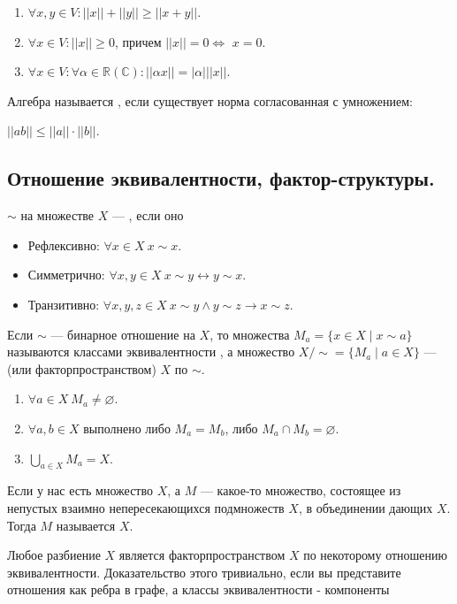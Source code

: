 \begin{enumerate}
    \item $\forall x, y \in V : ||x|| + ||y||\geq ||x+y||$.
    \item $\forall x \in V : ||x||\geq 0$, причем $||x||=0 \Leftrightarrow$ $x = 0$.
    \item $\forall x \in V : \forall \alpha \in \mathbb{R}(\mathbb{C}) : ||\alpha x|| = |\alpha|||x||$.
\end{enumerate}

Алгебра называется , если существует норма согласованная с умножением:

$||ab||\leq ||a|| \cdot ||b||$.

\subsection{Отношение эквивалентности, фактор-структуры.}



 $\sim$ на множестве $X$ --- , если оно
\begin{itemize}
    \item Рефлексивно: $\forall x\in X~x\sim x$.
    \item Симметрично: $\forall x,y\in X~x\sim y\leftrightarrow y\sim x$.
    \item Транзитивно: $\forall x,y,z\in X~x\sim y\land y\sim z\rightarrow x\sim z$.
\end{itemize}
Если $\sim$ --- бинарное отношение на $X$, то множества $M_a=\{x\in X\mid x\sim a\}$ называются классами эквивалентности , а множество $X/\sim=\{M_a\mid a\in X\}$ ---  (или {факторпространством}) $X$ по $\sim$.

\begin{enumerate}
    \item $\forall a\in X~M_a\neq\varnothing$.
    \item $\forall a,b\in X$ выполнено либо $M_a=M_b$, либо $M_a\cap M_b=\varnothing$.
    \item $\bigcup\limits_{a\in X}M_a=X$.
\end{enumerate}

Если у нас есть множество $X$, а $M$ --- какое-то множество, состоящее из непустых взаимно непересекающихся подмножеств $X$, в объединении дающих $X$. Тогда $M$ называется  $X$.


Любое разбиение $X$ является факторпространством $X$ по некоторому отношению эквивалентности. Доказательство этого тривиально, если вы представите отношения как ребра в графе, а классы эквивалентности - компоненты


